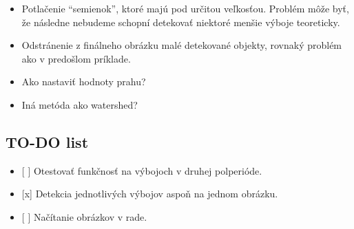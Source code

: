 \documentclass[]{article}
\providecommand{\tightlist}{%
  \setlength{\itemsep}{0pt}\setlength{\parskip}{0pt}}
\begin{document}
\begin{itemize}
\tightlist
\item
  Potlačenie ``semienok'', ktoré majú pod určitou veľkosťou. Problém
  môže byť, že následne nebudeme schopní detekovať niektoré menšie
  výboje teoreticky.
\item
  Odstránenie z finálneho obrázku malé detekované objekty, rovnaký
  problém ako v predošlom príklade.
\item
  Ako nastaviť hodnoty prahu?
\item
  Iná metóda ako watershed?
\end{itemize}

\subsection{TO-DO list}\label{to-do-list}

\begin{itemize}
\tightlist
\item
  {[} {]} Otestovať funkčnosť na výbojoch v druhej polperióde.
\item
  {[}x{]} Detekcia jednotlivých výbojov aspoň na jednom obrázku.
\item
  {[} {]} Načítanie obrázkov v rade.
\end{itemize}
\end{document}
